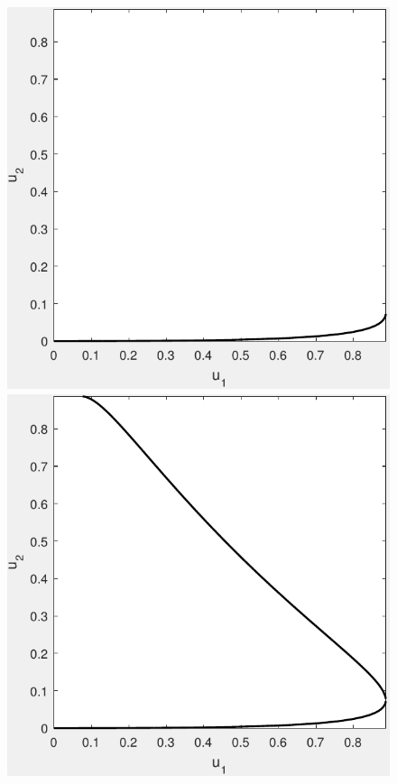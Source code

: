 		\begin{figure}[ht]
			\centering
			\begin{minipage}[b]{0.32\linewidth}
				\includegraphics[width=\textwidth]{GammaTrace01}
			\end{minipage}
			\begin{minipage}[b]{0.32\linewidth}
				\includegraphics[width=\textwidth]{GammaTrace02}

\end{minipage}
\end{figure}
